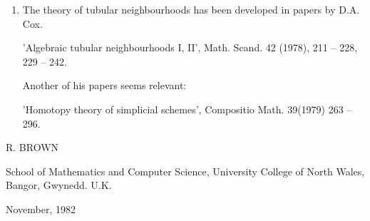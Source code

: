 \documentclass[11pt,a4paper]{article}
\begin{document}
\begin{enumerate}
  \item[10.] The theory of tubular neighbourhoods has been developed in papers by D.A. Cox.

  'Algebraic tubular neighbourhoods I, II', Math. Scand. 42 (1978), 211 -- 228, 229 -- 242.

  Another of his papers seems relevant:

  'Homotopy theory of simplicial schemes', Compositio Math. 39(1979) 263 -- 296.
\end{enumerate}

R. BROWN

School of Mathematics and Computer Science, University College of North Wales, Bangor, Gwynedd. U.K.

November, 1982

\end{document}
